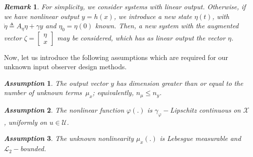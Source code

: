\documentclass{ifacconf}
\newtheorem{remark}{\it \textbf{Remark}}%
\newtheorem{assumption}{\it \textbf{Assumption}}%
\begin{document}
\begin{remark}
For simplicity, we consider systems with linear output. Otherwise, if we have nonlinear output $y = h(x)$, we introduce a new state $\eta(t)$, with $\dot{\eta} \triangleq A_{\eta} \eta + \gamma y$ and $\eta_0 = \eta(0)$ known. Then, a new system with the augmented vector $\zeta = \begin{bmatrix} \eta \\ x \end{bmatrix}$ may be considered, which has as linear output the vector $\eta$.
\end{remark}


Now, let us introduce the following assumptions which are required for our unknown input observer design methods.
\begin{assumption}\label{ali_hyp1}
The output vector $y$ has dimension greater than or equal to the number of unknown terms~$\mu_{x}$; equivalently, $n_{\mu} \leq n_y$.
\end{assumption}

\begin{assumption}\label{ali_hyp2}
The nonlinear function $\varphi(.)$ is $\gamma_{\varphi}-$Lipschitz continuous on $\mathcal{X}$, uniformly on $u\in\mathcal{U}$.
\end{assumption}

\begin{assumption}\label{ali_hyp3}
The unknown nonlinearity $\mu_{x}(.)$ is Lebesgue measurable and $\mathcal{L}_{2}-$bounded.
\end{assumption}
\end{document}
